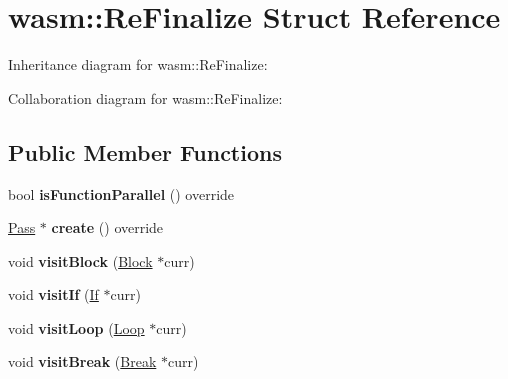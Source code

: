 \hypertarget{structwasm_1_1_re_finalize}{}\section{wasm\+:\+:Re\+Finalize Struct Reference}
\label{structwasm_1_1_re_finalize}


Inheritance diagram for wasm\+:\+:Re\+Finalize\+:


Collaboration diagram for wasm\+:\+:Re\+Finalize\+:
\subsection*{Public Member Functions}
\begin{DoxyCompactItemize}
\item 
\mbox{\label{structwasm_1_1_re_finalize_af60a9338102344c299b261182bd0bca3}} 
bool {\bfseries is\+Function\+Parallel} () override
\item 
\mbox{\label{structwasm_1_1_re_finalize_a10d26ca84382d4accaa87e7221b808b9}} 
\mbox{\hyperlink{classwasm_1_1_pass}{Pass}} $\ast$ {\bfseries create} () override
\item 
\mbox{\label{structwasm_1_1_re_finalize_a0c446f68236ce284bc662b9dd8999cca}} 
void {\bfseries visit\+Block} (\mbox{\hyperlink{classwasm_1_1_block}{Block}} $\ast$curr)
\item 
\mbox{\label{structwasm_1_1_re_finalize_a1536f75f42e89e480d4b34b6e1e93f38}} 
void {\bfseries visit\+If} (\mbox{\hyperlink{classwasm_1_1_if}{If}} $\ast$curr)
\item 
\mbox{\label{structwasm_1_1_re_finalize_ab457c14610366a49a5d1bc671a90e739}} 
void {\bfseries visit\+Loop} (\mbox{\hyperlink{classwasm_1_1_loop}{Loop}} $\ast$curr)
\item 
\mbox{\label{structwasm_1_1_re_finalize_a09cce5cfd636719ee959cae1aef5c395}} 
void {\bfseries visit\+Break} (\mbox{\hyperlink{classwasm_1_1_break}{Break}} $\ast$curr)
\item 
\mbox{\label{structwasm_1_1_re_finalize_a661e50774639cd4c81e9adc378f8443e}} 

\end{DoxyCompactItemize}

